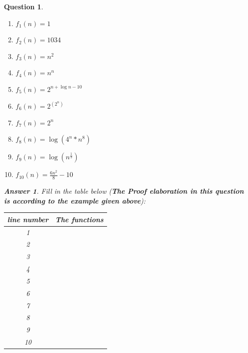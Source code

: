 \documentclass[a4paper]{article}
\theoremstyle{remarksStyle}
\theoremstyle{questionStyle}
\newtheorem{question}{Question}
\theoremstyle{answerStyle}
\newtheorem{answer}{Answer}
\begin{document}
\begin{question}
\begin{enumerate}
    \item $f_{1}(n) = 1$
    \item $f_{2}(n) = 1034$
    \item $f_{3}(n) = n^{2}$
    \item $f_{4}(n) = n^{n}$
    \item $f_{5}(n) = 2^{n + \log n - 10}$
    \item $f_{6}(n) = 2^{(2^{n})}$
    \item $f_{7}(n) = 2^{n}$
    \item $f_{8}(n) = \log{(4^{n}*n^{8})}$
    \item $f_{9}(n) = \log{(n^{\frac{1}{3}})}$
    \item $f_{10}(n) = \frac{6n^2}{8} - 10$
   
\end{enumerate}


\begin{answer}
    Fill in the table below (\textbf{The Proof elaboration in this question is according to the example given above}):
\end{answer}

\begin{center}
\begin{tabular}{||c | c ||} 
 \hline
 line number & The functions \\ [0.5ex] 
 \hline\hline
 1 &  \\ 
 \hline
 2 &  \\
 \hline
 3 & \\
 \hline
 4 &  \\
 \hline
 5 & \\
 \hline
 6 & \\
 \hline
 7 & \\
 \hline
 8 & \\
 \hline
 9 & \\
 \hline
  10 & \\
 \hline
\end{tabular}
\end{center}
\end{question}


\newpage
\end{document}
